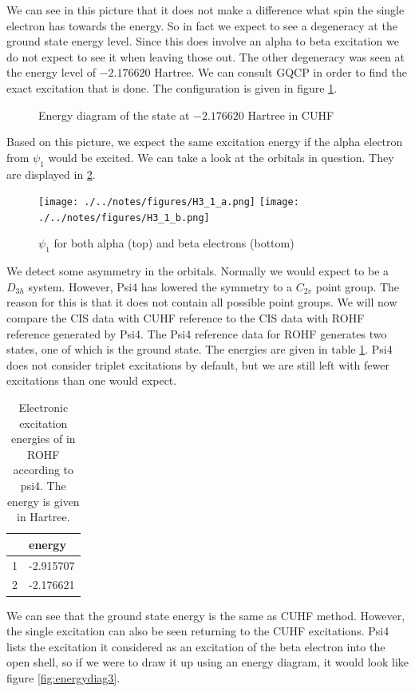 \documentclass[twoside,twocolumn,9pt]{article}
\begin{document}
We can see in this picture that it does not make a difference what spin the single electron has towards the energy. So in fact we expect to see a degeneracy at the ground state 
energy level. Since this does involve an alpha to beta excitation we do not expect to see it when leaving those out. The other degeneracy was seen at the energy level of $-2.176620$
Hartree. We can consult GQCP in order to find the exact excitation that is done. The configuration is given in figure \ref{fig:energydiag2}.

\begin{figure}[h]
  \begin{center}
  \end{center}
  \caption{Energy diagram of the state at $-2.176620$ Hartree in CUHF}
  \label{fig:energydiag2}
\end{figure}

Based on this picture, we expect the same excitation energy if the alpha electron from $\psi_1$ would be excited. We can take a look at the orbitals in question.  
They are displayed in \ref{fig:1_cuhf}.
\begin{figure}[h]
  \texttt{[image: ./../notes/figures/H3\_1\_a.png]}
  \texttt{[image: ./../notes/figures/H3\_1\_b.png]}
  \caption{$\psi_1$ for both alpha (top) and beta electrons (bottom)}
  \label{fig:1_cuhf}
\end{figure}
We detect some asymmetry in the orbitals. Normally we would expect  to be a $D_{3h}$ system. However, Psi4 has lowered the symmetry to a $C_{2v}$
point group. The reason for this is that it does not contain all possible point groups.
We will now compare the CIS data with CUHF reference to the CIS data with ROHF reference generated by Psi4.
The Psi4 reference data for ROHF generates two states, one of which is the ground state. The energies are given in table \ref{tab:ROHF}. Psi4 does not consider triplet excitations by
default, but we are still left with fewer excitations than one would expect.
\begin{table}[h]
  \caption{Electronic excitation energies of  in ROHF according to psi4. The energy is given in Hartree.}
  \label{tab:ROHF}
  \begin{tabular}{l|l}
      & energy    \\
    \hline
    1 & -2.915707 \\
    2 & -2.176621
  \end{tabular}
\end{table}
We can see that the ground state energy is the same as CUHF method. However, the single excitation can also be seen returning to the CUHF excitations. Psi4 lists the excitation it
considered as an excitation of the beta electron into the open shell, so if we were to draw it up using an energy diagram, it would look like figure \ref{fig:energydiag3}.
\end{document}
